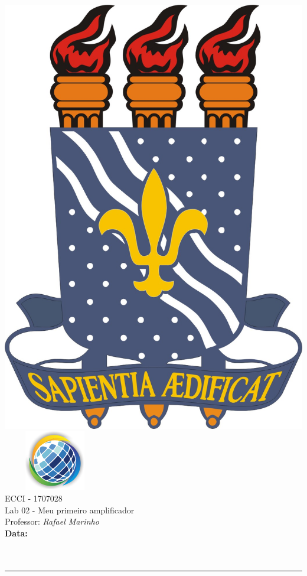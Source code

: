 \documentclass[10pt,addpoints]{exam}%
\newcommand{\class}{ECCI - 1707028}
\newcommand{\examnum}{Lab 02 - Meu primeiro amplificador}
\newcommand{\examdate}{}
\begin{document}
\noindent
\begin{minipage}[c]{0.7\linewidth}
\includegraphics[scale=0.14]{../logo/logo-ufpb.jpg}~~~~~\includegraphics[scale=2]{../logo/logo-cear.png}\\[6pt]
{\large \class}\\[4pt]
{\examnum}\\[4pt]
Professor: {\emph{Rafael Marinho}}\\[4pt]
\textbf{Data: \examdate}\\[10pt]
\noindent{}\makebox[3in]{\hrulefill}\\[10pt]
\noindent{}\makebox[3in]{\hrulefill}\\
\end{minipage}
\hfill
\begin{minipage}[t]{0.3\linewidth}
\gradetable[v][questions]
\end{minipage}
\noindent
\rule{\textwidth}{1pt}\vspace{10pt}

\vfill
\end{document}
